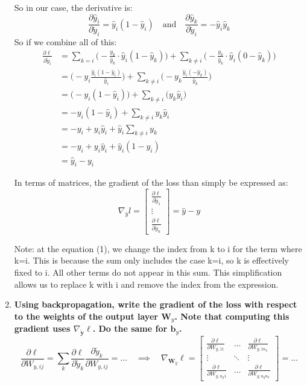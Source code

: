 \documentclass[12pt,a4paper]{article}
\begin{document}
\begin{enumerate}[resume]
    So in our case, the derivative is:
    \[
        \frac{\partial \hat{y}_i}{\partial \tilde{y}_i} = \hat{y}_i (1 - \hat{y}_i) \quad \text{and} \quad
        \frac{\partial \hat{y}_k}{\partial \tilde{y}_i} = - \hat{y}_i \hat{y}_k 
    \]
    So if we combine all of this:
    \begin{align*}
        \frac{\partial \ell}{\partial \tilde{y}_i} 
        &= \sum_{k=i} \Big(- \frac{y_k}{\hat{y}_k} \cdot \hat{y}_i (1 - \hat{y}_k) \Big)
        + \sum_{k \neq i} \Big(- \frac{y_k}{\hat{y}_k} \cdot \hat{y}_i (0 - \hat{y}_k) \Big) \\
        &= \Big(- y_i \frac{\hat{y}_i (1 - \hat{y}_i)}{\hat{y}_i} \Big)
        + \sum_{k \neq i} \Big(- y_k \frac{\hat{y}_i (- \hat{y}_k)}{\hat{y}_k} \Big) \tag{1}\\
        &= \Big(- y_i (1 - \hat{y}_i) \Big)
        + \sum_{k \neq i} \Big(y_k \hat{y}_i \Big) \\
        &= -y_i (1 - \hat{y}_i) + \sum_{k \neq i} y_k \hat{y}_i \\
        &= -y_i + y_i \hat{y}_i + \hat{y}_i \sum_{k \neq i} y_k \\
        &= -y_i + y_i \hat{y}_i + \hat{y}_i (1 - y_i) \\[1mm]
        &= \hat{y}_i - y_i
    \end{align*}

    In terms of matrices, the gradient of the loss than simply be expressed as: 
    $$\nabla_{\bar{y}} l =  
    \begin{bmatrix}
    \frac{\partial \ell}{\partial \tilde{y}_1} \\
    \vdots \\
    \frac{\partial \ell}{\partial \tilde{y}_n}
    \end{bmatrix}
    = \hat{y} - y$$

    Note: at the equation (1), we change the index from k to i for the term where k=i. 
    This is because the sum only includes the case k=i, so k is effectively fixed to i. 
    All other terms do not appear in this sum. 
    This simplification allows us to replace k with i and remove the index from the expression.

    \item \textbf{Using backpropagation, write the gradient of the loss with respect to the weights of the output 
    layer $\mathbf{W}_y$. Note that computing this gradient uses $\nabla_{\tilde{\mathbf{y}}} \ell$. Do the same for $\mathbf{b}_y$.} \newline
    \[
    \frac{\partial \ell}{\partial W_{y,ij}} 
    = \sum_k \frac{\partial \ell}{\partial \tilde{y}_k} \frac{\partial \tilde{y}_k}{\partial W_{y,ij}}
    = \dots 
    \quad \implies \quad
    \nabla_{\mathbf{W}_y} \ell =
    \begin{bmatrix}
    \frac{\partial \ell}{\partial W_{y,11}} & \dots & \frac{\partial \ell}{\partial W_{y,1n_h}} \\
    \vdots & \ddots & \vdots \\
    \frac{\partial \ell}{\partial W_{y,n_y1}} & \dots & \frac{\partial \ell}{\partial W_{y,n_y n_h}}
    \end{bmatrix}
    = \dots
    \]


\end{enumerate}
\end{document}
